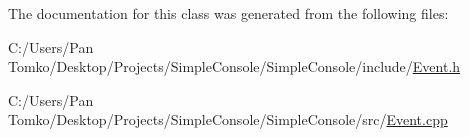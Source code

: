 The documentation for this class was generated from the following files\+:\begin{DoxyCompactItemize}
\item 
C\+:/\+Users/\+Pan Tomko/\+Desktop/\+Projects/\+Simple\+Console/\+Simple\+Console/include/\mbox{\hyperlink{_event_8h}{Event.\+h}}\item 
C\+:/\+Users/\+Pan Tomko/\+Desktop/\+Projects/\+Simple\+Console/\+Simple\+Console/src/\mbox{\hyperlink{_event_8cpp}{Event.\+cpp}}\end{DoxyCompactItemize}
